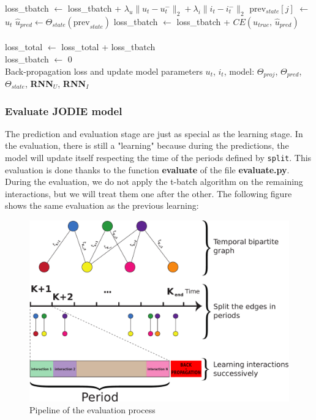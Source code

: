 \begin{algorithm}[H]
\begin{algorithmic}
                \STATE loss\_tbatch $\leftarrow$ loss\_tbatch + $\lambda_u \| u_t - u_t^- \|_2 + \lambda_i \| i_t - i_t^- \|_2$
                    \STATE  prev$_{state}[j]$ $\leftarrow$ $u_t$
                    \STATE $\widehat u_{pred} \leftarrow \Theta_{state}(\text{prev}_{state})$
                    \STATE loss\_tbatch $\leftarrow$ loss\_tbatch + $CE(u_{true},\,\widehat u_{pred})$
                \ENDIF\\
            \ENDFOR\\
            loss\_total $\leftarrow$ loss\_total + loss\_tbatch\\
            loss\_tbatch $\leftarrow$ 0\\
            Back-propagation loss and update model parameters
        \ENDFOR
        \RETURN $u_t$, $i_t$, model: $\Theta_{proj}$, $\Theta_{pred}$, $\Theta_{state}$, \textbf{RNN}$_U$, \textbf{RNN}$_I$
    \end{algorithmic}
\end{algorithm}

\subsubsection{Evaluate JODIE model}

The prediction and evaluation stage are just as special as the learning stage. In the evaluation, there is still a "learning" because during the predictions, the model will update itself respecting the time of the periods defined by \texttt{split}. This evaluation is done thanks to the function \textbf{evaluate} of the file \textbf{evaluate.py}. During the evaluation, we do not apply the t-batch algorithm on the remaining interactions, but we will treat them one after the other. The following figure shows the same evaluation as the previous learning:

\begin{figure}[H]
    \centering
    \includegraphics[scale = 0.5]{image/pipeline-evaluate.pdf}
    \caption{Pipeline of the evaluation process}
\end{figure}

